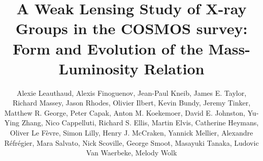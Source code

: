 \documentclass[12pt]{emulateapj}
\begin{document}
  

 \title{ A Weak Lensing Study of X-ray Groups in the COSMOS survey:
   Form and Evolution of the Mass-Luminosity Relation}



\author{Alexie Leauthaud,
Alexis Finoguenov,
Jean-Paul Kneib,
James E. Taylor, 
Richard Massey,
Jason Rhodes,
Olivier Ilbert,
Kevin Bundy,
Jeremy Tinker,
Matthew R. George,
Peter Capak,
Anton M. Koekemoer,
David E. Johnston,
Yu-Ying Zhang,
Nico Cappelluti,
Richard S. Ellis,
Martin Elvis,
Catherine Heymans,
Oliver Le F\`{e}vre,
Simon Lilly,
Henry J. McCraken,
Yannick Mellier,
Alexandre R\'{e}fr\'{e}gier,
Mara Salvato,
Nick Scoville,
George Smoot,
Masayuki Tanaka,
Ludovic Van Waerbeke,
Melody Wolk}


\end{document}
